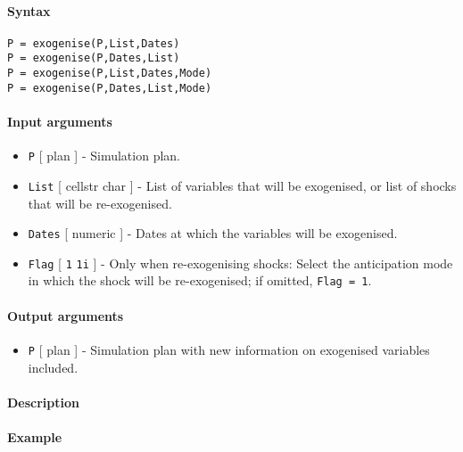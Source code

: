 


	\paragraph{Syntax}

\begin{verbatim}
P = exogenise(P,List,Dates)
P = exogenise(P,Dates,List)
P = exogenise(P,List,Dates,Mode)
P = exogenise(P,Dates,List,Mode)
\end{verbatim}

\paragraph{Input arguments}

\begin{itemize}
\item
  \texttt{P} {[} plan {]} - Simulation plan.
\item
  \texttt{List} {[} cellstr \textbar{} char {]} - List of variables that
  will be exogenised, or list of shocks that will be re-exogenised.
\item
  \texttt{Dates} {[} numeric {]} - Dates at which the variables will be
  exogenised.
\item
  \texttt{Flag} {[} \texttt{1} \textbar{} \texttt{1i} {]} - Only when
  re-exogenising shocks: Select the anticipation mode in which the shock
  will be re-exogenised; if omitted, \texttt{Flag = 1}.
\end{itemize}

\paragraph{Output arguments}

\begin{itemize}
\itemsep1pt\parskip0pt
\item
  \texttt{P} {[} plan {]} - Simulation plan with new information on
  exogenised variables included.
\end{itemize}

\paragraph{Description}

\paragraph{Example}


